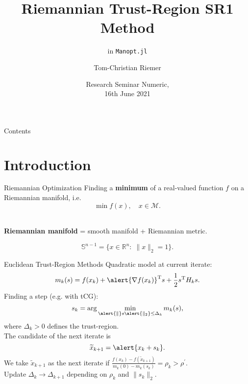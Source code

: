 \documentclass{beamer}
\title{Riemannian Trust-Region SR1 Method}
\subtitle{in \lstinline!Manopt.jl!}
\author{Tom-Christian Riemer}
\institute{TU Chemnitz}
\date{Research Seminar Numeric,\\ 16th June 2021}
\begin{document}
\maketitle

\begin{frame}{Contents}
	\tableofcontents
\end{frame}

\section{Introduction}

\begin{frame}{Riemannian Optimization}
    Finding a \textbf{minimum} of a real-valued function $f$ on a Riemannian manifold, i.e. \\
    \begin{equation*}
        \min f(x), \quad x \in \mathcal{M}.
    \end{equation*}\\[1.\baselineskip]
    \begin{center}
        \textbf{Riemannian manifold} = smooth manifold + Riemannian metric. \\[1.\baselineskip]
    \end{center}
    \begin{equation*}
        \mathbb{S}^{n-1} = \{ x \in \mathbb{R}^n \colon \; \lVert x \rVert_2 = 1 \}.
    \end{equation*}
\end{frame}

\begin{frame}{Euclidean Trust-Region Methods}
    \alert{Quadratic model} at current iterate:
	\begin{equation*}
    	m_k(s) = f(x_k) + \alert{\nabla f(x_k)}^{\mathrm{T}} s + \frac{1}{2} s^{\mathrm{T}} H_k s.
    \end{equation*}
	Finding a \alert{step} (e.g. with tCG):
	\begin{equation*}
        s_k = \arg \min_{\alert{\lVert} s \alert{\rVert_2} \leq \Delta_k} m_k(s),
    \end{equation*}
	where $\Delta_k > 0$ defines the \alert{trust-region}. \\
    The candidate of the next iterate is
	\begin{equation*}
        \widetilde{x}_{k+1} = \alert{x_k + s_k}.
    \end{equation*}
	We take $\widetilde{x}_{k+1}$ as the next iterate if $\frac{f(x_k) - f(\widetilde{x}_{k+1})}{m_k(0) - m_k(s_k)} =\rho_k > \rho^{\prime}$. \\[0.1\baselineskip]
    Update $\Delta_k \rightarrow \Delta_{k+1}$ depending on $\rho_k$ and $\lVert s_k \rVert_2$.
\end{frame}
\end{document}
